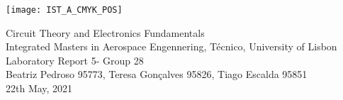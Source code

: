 
\thispagestyle {empty}

\texttt{[image: IST\_A\_CMYK\_POS]}

\begin{center}
%
\vspace{1.0cm}

\vspace{1cm}
{\FontLb Circuit Theory and Electronics Fundamentals} \\ %
\vspace{1cm}
{\FontSn Integrated Masters in Aerospace Engennering, Técnico, University of Lisbon} \\ %
\vspace{1cm}
{\FontSn Laboratory Report 5- Group 28} \\
\vspace{1cm}
{\FontSn Beatriz Pedroso 95773, Teresa Gonçalves 95826, Tiago Escalda 95851}\\
\vspace{1cm}
{\FontSn 22th May, 2021} \\ %
%
\end{center}

